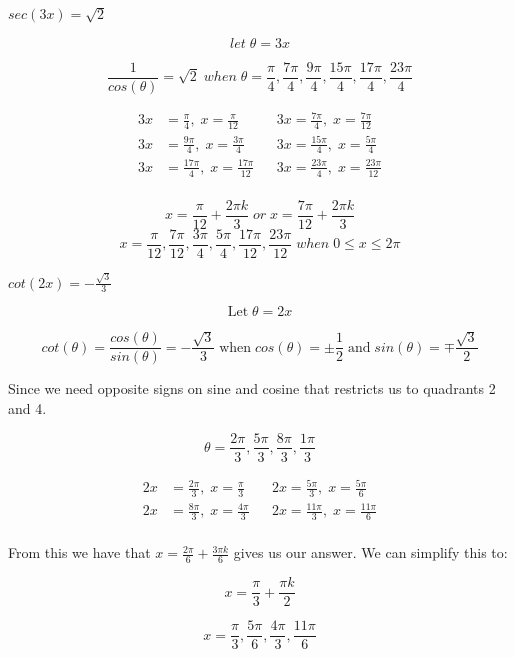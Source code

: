 \documentclass[10pt,letterpaper]{amspset}
\begin{document}
\begin{problem}[6]
    $sec(3x) = \sqrt{2}$
\end{problem}

\begin{solution}
   \[let \; \theta = 3x\]
   
   \[\frac{1}{cos(\theta)} = \sqrt{2} \; when \; \theta = \frac{\pi}{4}, \frac{7\pi}{4}, \frac{9\pi}{4}, \frac{15\pi}{4}, \frac{17\pi}{4}, \frac{23\pi}{4}\]
       
    \begin{align}
        3x &= \frac{\pi}{4}, \; x = \frac{\pi}{12} && 3x = \frac{7\pi}{4}, \; x = \frac{7\pi}{12}\\[+3mm]
        3x &= \frac{9\pi}{4}, \; x = \frac{3\pi}{4} && 3x = \frac{15\pi}{4}, \; x = \frac{5\pi}{4}\\[+3mm]
        3x &= \frac{17\pi}{4}, \; x = \frac{17\pi}{12} && 3x = \frac{23\pi}{4}, \; x = \frac{23\pi}{12}\\
    \end{align}
    
    \[\boxed{ x = \frac{\pi}{12} + \frac{2\pi k}{3} \; or \; x = \frac{7\pi}{12} + \frac{2\pi k}{3}}\]
    \[\boxed{ x = \frac{\pi}{12}, \frac{7\pi}{12}, \frac{3\pi}{4}, \frac{5\pi}{4}, \frac{17\pi}{12}, \frac{23\pi}{12} \; when \; 0 \leq x \leq 2\pi  }\]
\end{solution}


\pagebreak


\begin{problem}[7]
    $cot(2x) = -\frac{\sqrt{3}}{3}$
\end{problem}

\begin{solution}
   \[\text{Let} \; \theta = 2x\]
   
   \[cot(\theta) = \frac{cos(\theta)}{sin(\theta)} = -\frac{\sqrt{3}}{3} \; \text{when} \; cos(\theta) = \pm \frac{1}{2} \; \text{and} \; sin(\theta) = \mp \frac{\sqrt{3}}{2}\]
  
     Since we need opposite signs on sine and cosine that restricts us to quadrants 2 and 4.
   
   \[ \theta = \frac{2\pi}{3}, \frac{5\pi}{3}, \frac{8\pi}{3}, \frac{1\pi}{3} \]
  
   
       
    \begin{align}
        2x &= \frac{2\pi}{3}, \; x = \frac{\pi}{3} && 2x = \frac{5\pi}{3}, \; x = \frac{5\pi}{6}\\[+3mm]
        2x &= \frac{8\pi}{3}, \; x = \frac{4\pi}{3} && 2x = \frac{11\pi}{3}, \; x = \frac{11\pi}{6}\\
    \end{align}
    
    From this we have that $x = \frac{2\pi}{6} + \frac{3\pi k}{6}$ gives us our answer. We can simplify this to:
    
    \[\boxed{ x = \frac{\pi}{3} + \frac{\pi k}{2}}\]
    
    \[\boxed{x = \frac{\pi}{3}, \frac{5\pi}{6}, \frac{4\pi}{3}, \frac{11\pi}{6}}\]
\end{solution}
\end{document}
